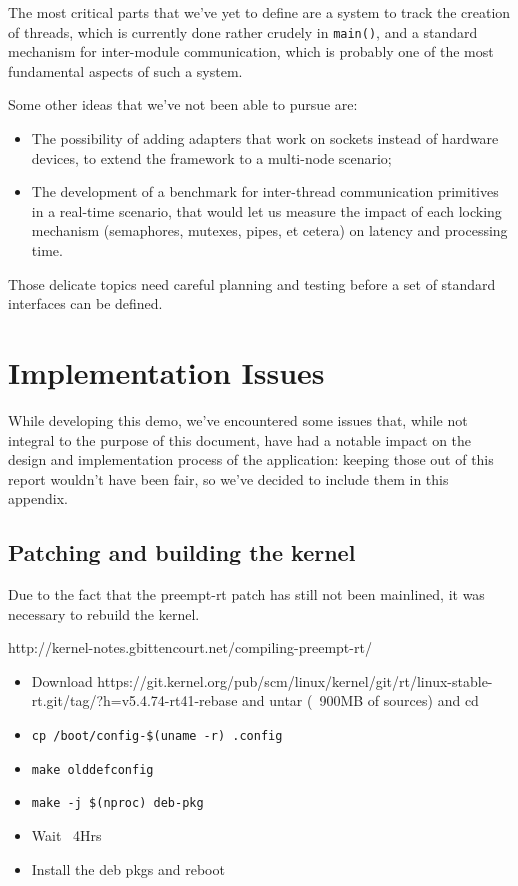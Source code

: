 \documentclass[a4paper,12pt]{report}
\begin{document}
The most critical parts that we've yet to define are a system to track the creation of threads, which is currently done rather crudely in \texttt{main()}, and a standard mechanism for inter-module communication, which is probably one of the most fundamental aspects of such a system.

Some other ideas that we've not been able to pursue are:

\begin{itemize}
    \item The possibility of adding adapters that work on sockets instead of hardware devices, to extend the framework to a multi-node scenario;
    \item The development of a benchmark for inter-thread communication primitives in a real-time scenario, that would let us measure the impact of each locking mechanism (semaphores, mutexes, pipes, et cetera) on latency and processing time.
\end{itemize}

Those delicate topics need careful planning and testing before a set of standard interfaces can be defined.

\newpage
\chapter{Implementation Issues}

While developing this demo, we've encountered some issues that, while not integral to the purpose of this document, have had a notable impact on the design and implementation process of the application: keeping those out of this report wouldn't have been fair, so we've decided to include them in this appendix. 

\section{Patching and building the kernel}

Due to the fact that the preempt-rt patch has still not been mainlined, it was necessary to rebuild the kernel. 

http://kernel-notes.gbittencourt.net/compiling-preempt-rt/

\begin{itemize}
    \item Download https://git.kernel.org/pub/scm/linux/kernel/git/rt/linux-stable-rt.git/tag/?h=v5.4.74-rt41-rebase and untar (~900MB of sources) and cd
    \item \texttt{cp /boot/config-\$(uname -r) .config}
    \item \texttt{make olddefconfig}
    \item \texttt{make -j \$(nproc) deb-pkg}
    \item Wait ~4Hrs
    \item Install the deb pkgs and reboot
\end{itemize}
\end{document}
